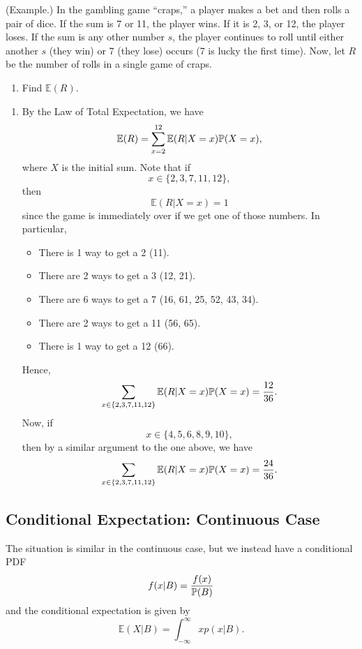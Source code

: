 \documentclass[letterpaper]{article}
\begin{document}
\begin{mdframed}[]
    (Example.) In the gambling game ``craps,'' a player makes a bet and then rolls a pair of dice. If the sum is 7 or 11, the player wins. If it is 2, 3, or 12, the player loses. If the sum is any other number $s$, the player continues to roll until either another $s$ (they win) or 7 (they lose) occurs (7 is lucky the first time). Now, let $R$ be the number of rolls in a single game of craps.
    \begin{enumerate}
        \item Find $\mathbb{E}(R)$. 
    \end{enumerate}

    \begin{mdframed}[]
        \begin{enumerate}
            \item By the Law of Total Expectation, we have 
            \[\mathbb{E}(R) = \sum_{x = 2}^{12} \mathbb{E}(R | X = x)\mathbb{P}(X = x),\]
            where $X$ is the initial sum. Note that if 
            \[x \in \{2, 3, 7, 11, 12\},\]
            then \[\mathbb{E}(R | X = x) = 1\]
            since the game is immediately over if we get one of those numbers. In particular,
            \begin{itemize}
                \item There is 1 way to get a 2 (11).
                \item There are 2 ways to get a 3 (12, 21).
                \item There are 6 ways to get a 7 (16, 61, 25, 52, 43, 34).
                \item There are 2 ways to get a 11 (56, 65).
                \item There is 1 way to get a 12 (66).
            \end{itemize}
            Hence, 
            \[\sum_{x \in \{2, 3, 7, 11, 12\}} \mathbb{E}(R | X = x) \mathbb{P}(X = x) = \frac{12}{36}.\]
            Now, if \[x \in \{4, 5, 6, 8, 9, 10\},\] then by a similar argument to the one above, we have 
            \[\sum_{x \in \{2, 3, 7, 11, 12\}} \mathbb{E}(R | X = x)\mathbb{P}(X = x) = \frac{24}{36}.\]
        \end{enumerate}
    \end{mdframed}
\end{mdframed}

\subsection{Conditional Expectation: Continuous Case}
The situation is similar in the continuous case, but we instead have a conditional PDF 
\[f(x | B) = \frac{f(x)}{\mathbb{P}(B)}\]
and the conditional expectation is given by  
\[\mathbb{E}(X | B) = \int_{-\infty}^{\infty} xp(x | B).\]    
\end{document}
